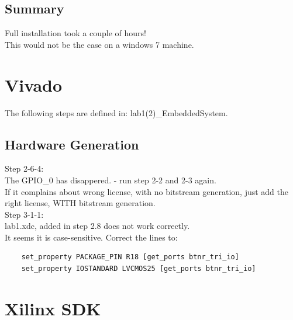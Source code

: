 \documentclass[]{report}
\begin{document}
\section{Summary}
Full installation took a couple of hours!\\
This would not be the case on a windows 7 machine.




\chapter{Vivado }
The following steps are defined in: lab1(2)\_EmbeddedSystem.

\section{Hardware Generation}
Step 2-6-4:\\
The GPIO\_0 has disappered. - run step 2-2 and 2-3 again.\\
If it complains about wrong license, with no bitstream generation, just add the right license, WITH bitstream generation.
\newline
\\
Step 3-1-1:\\
lab1.xdc, added in step 2.8 does not work correctly. \\
It seems it is case-sensitive. Correct the lines to:
\begin{lstlisting}
	set_property PACKAGE_PIN R18 [get_ports btnr_tri_io]
	set_property IOSTANDARD LVCMOS25 [get_ports btnr_tri_io]
\end{lstlisting}
\chapter{Xilinx SDK}
\end{document}
